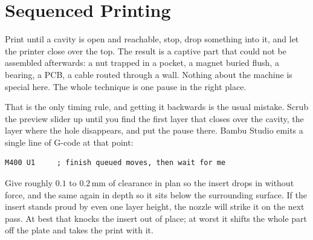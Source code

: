 
\chapter{Sequenced Printing}

 Print until a cavity is
open and reachable, stop, drop something into it, and let the printer close over
the top. The result is a captive part that could not be assembled afterwards:
a nut trapped in a pocket, a magnet buried flush, a bearing, a PCB, a cable
routed through a wall. Nothing about the machine is special here. The whole
technique is one pause in the right place.


 That is the only
timing rule, and getting it backwards is the usual mistake. Scrub the preview
slider up until you find the first layer that closes over the cavity, the layer
where the hole disappears, and put the pause there. Bambu Studio emits a single
line of G-code at that point:

\begin{verbatim}
M400 U1     ; finish queued moves, then wait for me
\end{verbatim}

 Give roughly
$0.1$ to $0.2$\,mm of clearance in plan so the insert drops in without force,
and the same again in depth so it sits below the surrounding surface. If the
insert stands proud by even one layer height, the nozzle will strike it on the
next pass. At best that knocks the insert out of place; at worst it shifts the
whole part off the plate and takes the print with it.


